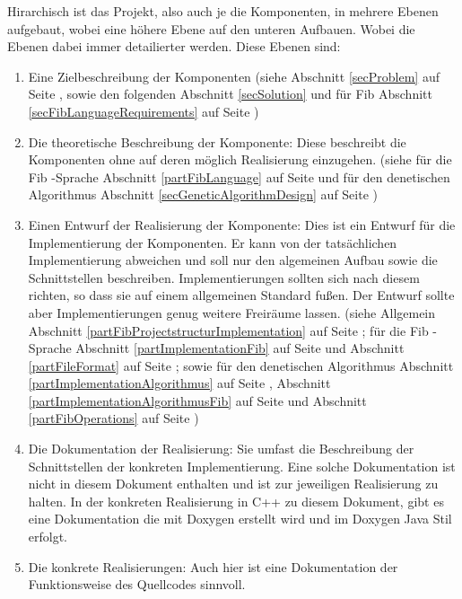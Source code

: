 \documentclass[11pt,a4paper]{article}
\begin{document}
Hirarchisch ist das Projekt, also auch je die Komponenten, in mehrere Ebenen aufgebaut, wobei eine höhere Ebene auf den unteren Aufbauen. Wobei die Ebenen dabei immer detailierter werden.
\bigskip\noindent
Diese Ebenen sind:
\begin{enumerate}
 \item Eine Zielbeschreibung der Komponenten (siehe Abschnitt \ref{secProblem} auf Seite \pageref{secProblem}, sowie den folgenden Abschnitt \ref{secSolution} und für Fib Abschnitt \ref{secFibLanguageRequirements} auf Seite \pageref{secFibLanguageRequirements} )
 \item Die theoretische Beschreibung der Komponente: Diese beschreibt die Komponenten ohne auf deren möglich Realisierung einzugehen. (siehe für die Fib -Sprache Abschnitt \ref{partFibLanguage} auf Seite \pageref{partFibLanguage} und für den denetischen Algorithmus Abschnitt \ref{secGeneticAlgorithmDesign} auf Seite \pageref{secGeneticAlgorithmDesign} )
 \item Einen Entwurf der Realisierung der Komponente: Dies ist ein Entwurf für die Implementierung der Komponenten. Er kann von der tatsächlichen Implementierung abweichen und soll nur den algemeinen Aufbau sowie die Schnittstellen beschreiben. Implementierungen sollten sich nach diesem richten, so dass sie auf einem allgemeinen Standard fußen. Der Entwurf sollte aber Implementierungen genug weitere Freiräume lassen. (siehe Allgemein Abschnitt \ref{partFibProjectstructurImplementation} auf Seite \pageref{partFibProjectstructurImplementation}; für die Fib -Sprache Abschnitt \ref{partImplementationFib} auf Seite \pageref{partImplementationFib} und Abschnitt \ref{partFileFormat} auf Seite \pageref{partFileFormat}; sowie für den denetischen Algorithmus Abschnitt \ref{partImplementationAlgorithmus} auf Seite \pageref{partImplementationAlgorithmus}, Abschnitt \ref{partImplementationAlgorithmusFib} auf Seite \pageref{partImplementationAlgorithmusFib} und Abschnitt \ref{partFibOperations} auf Seite \pageref{partFibOperations})
 \item Die Dokumentation der Realisierung: Sie umfast die Beschreibung der Schnittstellen der konkreten Implementierung. Eine solche Dokumentation ist nicht in diesem Dokument enthalten und ist zur jeweiligen Realisierung zu halten. In der konkreten Realisierung in C++ zu diesem Dokument, gibt es eine Dokumentation die mit Doxygen erstellt wird und im Doxygen Java Stil erfolgt.
 \item Die konkrete Realisierungen: Auch hier ist eine Dokumentation der Funktionsweise des Quellcodes sinnvoll.
\end{enumerate}
\end{document}
